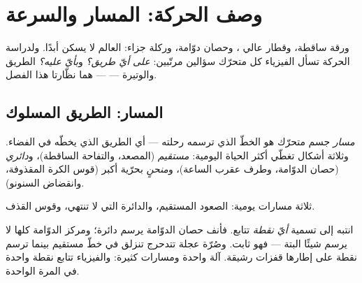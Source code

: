 \chapter{وصف الحركة: المسار والسرعة}\label{ch:g6:describing-motion}

ورقة ساقطة، وقطار عالي ، وحصان دوّامة، وركلة جزاء: العالم
لا يسكن أبدًا. ولدراسة الحركة تسأل الفيزياء كل متحرّك سؤالين
مرتّبين: \emph{على أيّ طريق؟} و\emph{بأيّ  عليه؟} الطريق
والوتيرة ---   --- هما نظّارتا هذا الفصل.

\section{المسار: الطريق المسلوك}

\begin{definition}[المسار]\label{def:g6:describing-motion:trajectory}
\emph{مسار} جسم متحرّك هو الخطّ الذي ترسمه رحلته ---
أي الطريق الذي يخطّه في الفضاء. وثلاثة أشكال تغطّي أكثر الحياة
اليومية: \emph{مستقيم} (المصعد، والتفاحة
الساقطة)، و\emph{دائري} (حصان الدوّامة، وطرف
عقرب الساعة)، و\emph{منحنٍ} بحرّية أكبر (قوس الكرة المقذوفة،
وانقضاض السنونو).
\end{definition}

\begin{omfigure}

{\small ثلاثة مسارات يومية: الصعود المستقيم، والدائرة التي لا
تنتهي، وقوس القذف.}
\end{omfigure}

\begin{example}[مسار مَن؟]\label{ex:g6:describing-motion:whose}
انتبه إلى تسمية \emph{أيّ نقطة} تتابع. فأنف حصان الدوّامة يرسم
دائرة؛ ومركز الدوّامة كلها لا يرسم شيئًا البتة --- فهو ثابت.
وصُرّة عجلة تتدحرج تنزلق في خطّ مستقيم بينما ترسم نقطة على
إطارها قفزات رشيقة. آلة واحدة ومسارات كثيرة: والفيزياء تتابع
نقطة واحدة في المرة الواحدة.
\end{example}

